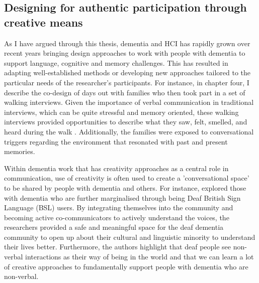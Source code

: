\subsection{Designing for authentic participation through creative means}
\label{RQ1:Creativity}
As I have argued through this thesis, dementia and HCI has rapidly grown over recent years bringing design approaches to work with people with dementia to support language, cognitive and memory challenges. This has resulted in adapting well-established methods or developing new approaches tailored to the particular needs of the researcher's participants. For instance, in chapter four, I describe the co-design of days out with families who then took part in a set of walking interviews. Given the importance of verbal communication in traditional interviews, which can be quite stressful and memory oriented, these walking interviews provided opportunities to describe what they saw, felt, smelled, and heard during the walk \citep{kullberg2017walking}. Additionally, the families were exposed to conversational triggers regarding the environment that resonated with past and present memories.

Within dementia work that has creativity approaches as a central role in communication, use of creativity is often used to create a 'conversational space' to be shared by people with dementia and others. For instance, \cite{ferguson2014dementia} explored those with dementia who are further marginalised through being Deaf British Sign Language (BSL) users. By integrating themselves into the community and becoming active co-communicators to actively understand the voices, the researchers provided a safe and meaningful space for the deaf dementia community to open up about their cultural and linguistic minority to understand their lives better. Furthermore, the authors highlight that deaf people see non-verbal interactions as their way of being in the world and that we can learn a lot of creative approaches to fundamentally support people with dementia who are non-verbal.

